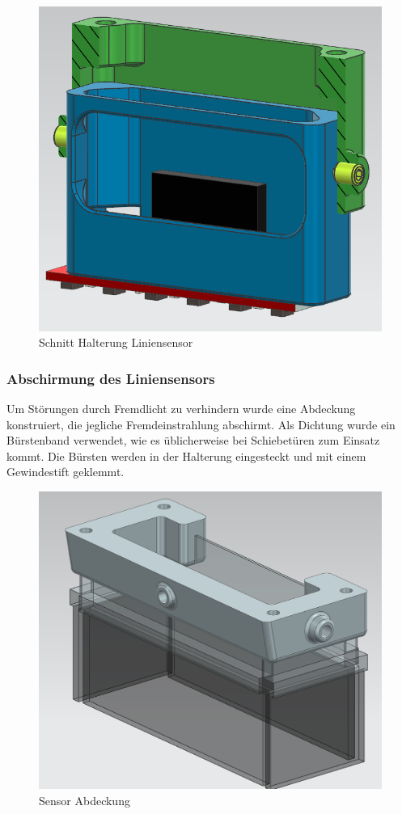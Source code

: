 \begin{figure}[H]
    \centering
    \includegraphics[width=0.75\linewidth]{assets//MT/Sensor Halterung.png}
    \caption{Schnitt Halterung Liniensensor}
    \label{fig:Schnitt Halterung Liniensensor}
\end{figure}


\subsubsection{Abschirmung des Liniensensors}
\label{Abschirmung des Liniensensors}

Um Störungen durch Fremdlicht zu verhindern wurde eine Abdeckung konstruiert, die jegliche Fremdeinstrahlung abschirmt. Als Dichtung wurde ein Bürstenband verwendet, wie es üblicherweise bei Schiebetüren zum Einsatz kommt. Die Bürsten werden in der Halterung eingesteckt und mit einem Gewindestift geklemmt. 


\begin{figure}
    \centering
    \includegraphics[width=0.75\linewidth]{assets//MT/Sensor Abdeckung.png}
    \caption{Sensor Abdeckung}
    \label{fig:Sensor Abdeckung}
\end{figure}
\newpage

